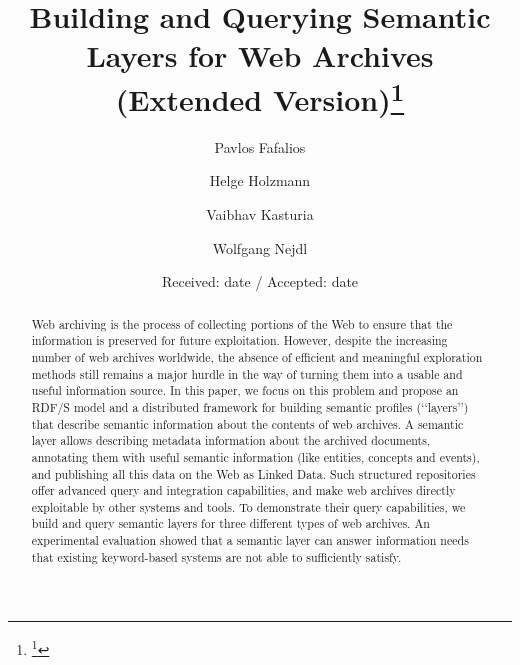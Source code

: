 \documentclass[twocolumn]{svjour3}
\newcommand{\q}[1]{\lq\lq{}{}#1\rq\rq{}{}}
\begin{document}
\sloppy

\title{Building and Querying Semantic Layers for Web Archives (Extended Version)\footnote{\thanks{* This
is an extended version of the paper: {\em P. Fafalios, H. Holzmann,
V. Kasturia, \& W. Nejdl, \lq\lq{}{}Building and Querying Semantic
Layers for Web Archives\rq\rq{}{}, 2017 ACM/IEEE-CS Joint Conference
on Digital Libraries, June 2017.}}}}


\author{Pavlos Fafalios \and
        Helge Holzmann  \and
        Vaibhav Kasturia \and
        Wolfgang Nejdl
       }



\date{Received: date / Accepted: date}

\maketitle


\begin{abstract}
Web archiving is the process of collecting portions of the Web to
ensure that the information is preserved for future exploitation.
However, despite the increasing number of web archives worldwide,
the absence of efficient and meaningful exploration methods still
remains a major hurdle in the way of turning them into a usable and
useful information source. In this paper, we focus on this problem
and propose an RDF/S model and a distributed framework for building
semantic profiles (\q{layers}) that describe semantic information
about the contents of web archives. A semantic layer allows
describing metadata information about the archived documents,
annotating them with useful semantic information (like entities,
concepts and events), and publishing all this data on the Web as
Linked Data. Such structured repositories offer advanced query and
integration capabilities, and make web archives directly exploitable
by other systems and tools. To demonstrate their query capabilities,
we build and query semantic layers for three different types of web
archives. An experimental evaluation showed that a semantic layer
can answer information needs that existing keyword-based systems are
not able to sufficiently satisfy.


\end{abstract}
\end{document}
